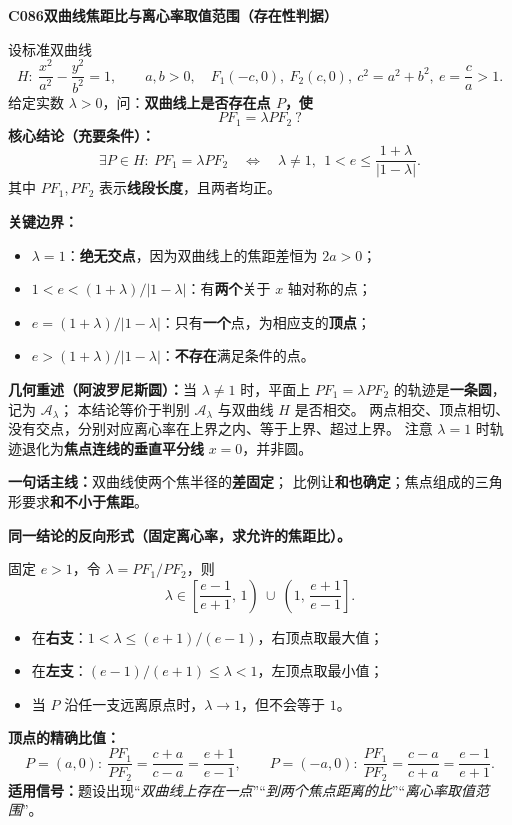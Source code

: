 \begin{statementbox}
\textbf{C086\quad 双曲线焦距比与离心率取值范围（存在性判据）}

设标准双曲线
\[
H:\ \frac{x^2}{a^2}-\frac{y^2}{b^2}=1,\qquad a,b>0,
\quad F_1(-c,0),\ F_2(c,0),\ c^2=a^2+b^2,\ e=\frac ca>1.
\]
给定实数 $\lambda>0$，问：\textbf{双曲线上是否存在点 $P$，使}
\[
\boxed{PF_1=\lambda PF_2\ ?}
\]
\textbf{核心结论（充要条件）：}
\[
\boxed{\exists P\in H:\ PF_1=\lambda PF_2}
\quad\Longleftrightarrow\quad
\boxed{\lambda\ne1,\ \ 1<e\le\frac{1+\lambda}{|1-\lambda|}}.
\]
其中 $PF_1,PF_2$ 表示\textbf{线段长度}，且两者均正。

\textbf{关键边界：}
\begin{itemize}
\item $\lambda=1$：\textbf{绝无交点}，因为双曲线上的焦距差恒为 $2a>0$；
\item $1<e<(1+\lambda)/|1-\lambda|$：有\textbf{两个}关于 $x$ 轴对称的点；
\item $e=(1+\lambda)/|1-\lambda|$：只有\textbf{一个}点，为相应支的\textbf{顶点}；
\item $e>(1+\lambda)/|1-\lambda|$：\textbf{不存在}满足条件的点。
\end{itemize}
\textbf{几何重述（阿波罗尼斯圆）：}当 $\lambda\ne1$ 时，平面上
$PF_1=\lambda PF_2$ 的轨迹是\textbf{一条圆}，记为 $\mathcal A_\lambda$；
本结论等价于判别 $\mathcal A_\lambda$ 与双曲线 $H$ 是否相交。
两点相交、顶点相切、没有交点，分别对应离心率在上界之内、等于上界、超过上界。
注意 $\lambda=1$ 时轨迹退化为\textbf{焦点连线的垂直平分线} $x=0$，并非圆。

\textbf{一句话主线：}双曲线使两个焦半径的\textbf{差固定}；
比例让\textbf{和也确定}；焦点组成的三角形要求\textbf{和不小于焦距}。
\end{statementbox}

\clearpage
\begin{statementbox}
\textbf{同一结论的反向形式（固定离心率，求允许的焦距比）。}

固定 $e>1$，令 $\lambda=PF_1/PF_2$，则
\[
\boxed{\lambda\in\left[\frac{e-1}{e+1},\,1\right)
\ \cup\ \left(1,\,\frac{e+1}{e-1}\right]}.
\]
\begin{itemize}
\item 在\textbf{右支}：$1<\lambda\le(e+1)/(e-1)$，右顶点取最大值；
\item 在\textbf{左支}：$(e-1)/(e+1)\le\lambda<1$，左顶点取最小值；
\item 当 $P$ 沿任一支远离原点时，$\lambda\to1$，但不会等于 $1$。
\end{itemize}

\begin{center}\end{center}

\textbf{顶点的精确比值：}
\[
P=(a,0):\ \frac{PF_1}{PF_2}=\frac{c+a}{c-a}=\frac{e+1}{e-1},
\qquad
P=(-a,0):\ \frac{PF_1}{PF_2}=\frac{c-a}{c+a}=\frac{e-1}{e+1}.
\]
\textbf{适用信号：}题设出现“\emph{双曲线上存在一点}”“\emph{到两个焦点距离的比}”“\emph{离心率取值范围}”。
\end{statementbox}
